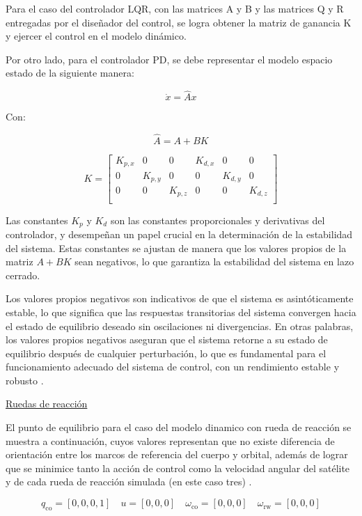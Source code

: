 Para el caso del controlador LQR, con las matrices A y B y las matrices Q y R entregadas por el diseñador del control, se logra obtener la matriz de ganancia K y ejercer el control en el modelo dinámico.

Por otro lado, para el controlador PD, se debe representar el modelo espacio estado de la siguiente manera:

\[
	\dot{x} = \hat{A} x
\]

Con: 

\[
	\hat{A} = A + BK
\]

\[
	K = \begin{bmatrix}
		K_{p,x} & 0 & 0 & K_{d,x} & 0 & 0 \\
		0 & K_{p,y} & 0 & 0 & K_{d,y} & 0 \\
		0 & 0 & K_{p,z} & 0 & 0 & K_{d,z} \\
		
	\end{bmatrix}
\]

Las constantes \(K_p\) y \(K_d\) son las constantes proporcionales y derivativas del controlador, y desempeñan un papel crucial en la determinación de la estabilidad del sistema. Estas constantes se ajustan de manera que los valores propios de la matriz \(A + BK\) sean negativos, lo que garantiza la estabilidad del sistema en lazo cerrado.

Los valores propios negativos son indicativos de que el sistema es asintóticamente estable, lo que significa que las respuestas transitorias del sistema convergen hacia el estado de equilibrio deseado sin oscilaciones ni divergencias. En otras palabras, los valores propios negativos aseguran que el sistema retorne a su estado de equilibrio después de cualquier perturbación, lo que es fundamental para el funcionamiento adecuado del sistema de control, con un rendimiento estable y robusto \cite{ref43}.

\underline{Ruedas de reacción}

El punto de equilibrio para el caso del modelo dinamico con rueda de reacción se muestra a continuación, cuyos valores representan que no existe diferencia de orientación entre los marcos de referencia del cuerpo y orbital, además de lograr que se minimice tanto la acción de control como la velocidad angular del satélite y de cada rueda de reacción simulada (en este caso tres) \cite{ref41}.

\[
q_{\text{co}} = [0, 0, 0, 1] \quad u = [0, 0, 0] \quad 	\omega_{\text{co}} = [0, 0, 0] \quad 	\omega_{\text{rw}} = [0, 0, 0]
\]




